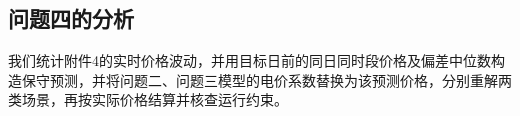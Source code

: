 \subsection{问题四的分析}

我们统计附件4的实时价格波动，并用目标日前的同日同时段价格及偏差中位数构造保守预测，并将问题二、问题三模型的电价系数替换为该预测价格，分别重解两类场景，再按实际价格结算并核查运行约束。


